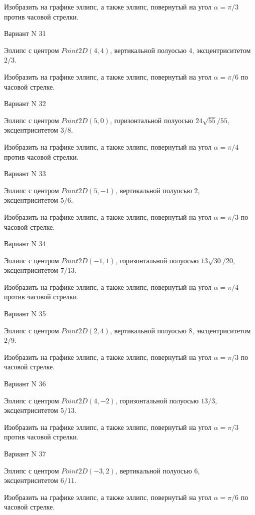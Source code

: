 \documentclass[11pt]{report}
\begin{document}
    Изобразить на графике эллипс, а также эллипс, повернутый на угол $\alpha = $$\pi / 3$ против часовой стрелки.

Вариант N 31

Эллипс с центром $Point2D\left(4, 4\right)$, вертикальной полуосью $4$, эксцентриситетом $2 / 3$.

    Изобразить на графике эллипс, а также эллипс, повернутый на угол $\alpha = $$\pi / 6$ по часовой стрелке.

Вариант N 32

Эллипс с центром $Point2D\left(5, 0\right)$, горизонтальной полуосью $24 \sqrt{55} / 55$, эксцентриситетом $3 / 8$.

    Изобразить на графике эллипс, а также эллипс, повернутый на угол $\alpha = $$\pi / 4$ против часовой стрелки.

Вариант N 33

Эллипс с центром $Point2D\left(5, -1\right)$, вертикальной полуосью $2$, эксцентриситетом $5 / 6$.

    Изобразить на графике эллипс, а также эллипс, повернутый на угол $\alpha = $$\pi / 3$ по часовой стрелке.

Вариант N 34

Эллипс с центром $Point2D\left(-1, 1\right)$, горизонтальной полуосью $13 \sqrt{30} / 20$, эксцентриситетом $7 / 13$.

    Изобразить на графике эллипс, а также эллипс, повернутый на угол $\alpha = $$\pi / 4$ против часовой стрелки.

Вариант N 35

Эллипс с центром $Point2D\left(2, 4\right)$, вертикальной полуосью $8$, эксцентриситетом $2 / 9$.

    Изобразить на графике эллипс, а также эллипс, повернутый на угол $\alpha = $$\pi / 3$ по часовой стрелке.

Вариант N 36

Эллипс с центром $Point2D\left(4, -2\right)$, горизонтальной полуосью $13 / 3$, эксцентриситетом $5 / 13$.

    Изобразить на графике эллипс, а также эллипс, повернутый на угол $\alpha = $$\pi / 3$ против часовой стрелки.

Вариант N 37

Эллипс с центром $Point2D\left(-3, 2\right)$, вертикальной полуосью $6$, эксцентриситетом $6 / 11$.

    Изобразить на графике эллипс, а также эллипс, повернутый на угол $\alpha = $$\pi / 6$ по часовой стрелке.
\end{document}
